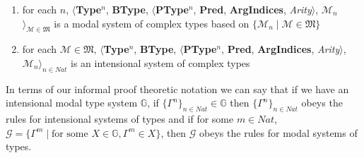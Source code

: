 \begin{shaded}
\begin{ex}
\begin{enumerate}
\item for each $n$, $\langle${\bf Type}$^n$, {\bf BType},
$\langle$\textbf{PType}$^n$, {\bf Pred}, \textbf{ArgIndices}, {\it
  Arity\/}$\rangle$, $\mathscr{M}_n$$\rangle_{\mathscr{M}\in\mathfrak{M}}$ is a modal
  system of complex types based on $\{\mathscr{M}_n\mid \mathscr{M}\in\mathfrak{M}\}$ 
 
\item for each $\mathscr{M}\in\mathfrak{M}$, $\langle${\bf Type}$^n$, {\bf BType},
$\langle$\textbf{PType}$^n$, {\bf Pred}, \textbf{ArgIndices}, {\it
  Arity\/}$\rangle$, $\mathscr{M}_n$$\rangle_{n\in\mathit{Nat}}$ is an
  intensional system of complex types
 
\end{enumerate}
\label{ex:intensional-modal-type-sys}
\end{ex}

In terms of our informal proof theoretic notation we can say that if
we have an intensional modal type system $\mathbb{G}$, if
$\{\Gamma^n\}_{n\in\textit{Nat}}\in\mathbb{G}$ then $\{\Gamma^n\}_{n\in\textit{Nat}}$ obeys the rules for
intensional systems of types and if for some $m\in\textit{Nat}$,
$\mathcal{G}=\{\Gamma^m\mid\text{for some } X\in\mathbb{G}, \Gamma^m\in X\}$,
then $\mathcal{G}$ obeys the rules for modal systems of types.
  
\end{shaded}
